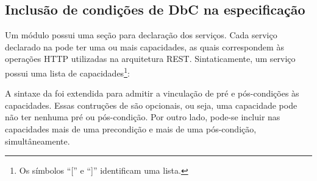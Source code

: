 % 
% 
% 

\subsection{Inclusão de condições de DbC na especificação \neoidl{}}
\label{SintaxeGeralDbc}

Um módulo \neoidl{} possui uma seção para declaração dos serviços. Cada serviço 
declarado na \neoidl{} pode ter uma ou mais
capacidades, as quais correspondem às operações HTTP utilizadas na arquitetura
REST. Sintaticamente, um serviço possui uma lista de capacidades\footnote{Os
símbolos ``['' e ``]'' identificam uma lista.}:

\begin{center}
\begin{footnotesize}
\end{footnotesize}
\end{center}

A sintaxe da \neoidl{} foi extendida para admitir a vinculação de pré e
pós-condições às capacidades. Essas contruções de \designbycontract{} são
opcionais, ou seja, uma capacidade pode não ter nenhuma pré ou pós-condição. Por
outro lado, pode-se incluir nas capacidades mais de uma precondição e mais de
uma pós-condição, simultâneamente.

\begin{center}
\begin{footnotesize}
\end{footnotesize}
\end{center}

